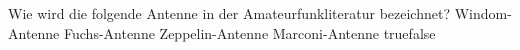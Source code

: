     {Wie wird die folgende Antenne in der Amateurfunkliteratur bezeichnet?  }
    {Windom-Antenne}
    {Fuchs-Antenne}
    {Zeppelin-Antenne}
    {Marconi-Antenne}
    {true}{false}
